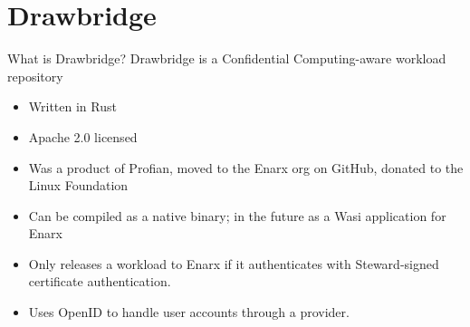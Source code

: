 \documentclass[graphics]{beamer}
\begin{document}
\section{Drawbridge}
\begin{frame}{What is Drawbridge?}
Drawbridge is a Confidential Computing-aware workload repository
\begin{itemize}
    \item Written in Rust
    \item Apache 2.0 licensed
    \item Was a product of Profian, moved to the Enarx org on GitHub, donated to the Linux Foundation
    \item Can be compiled as a native binary; in the future as a Wasi application for Enarx
    \item Only releases a workload to Enarx if it authenticates with Steward-signed certificate authentication.
    \item Uses OpenID to handle user accounts through a provider.
\end{itemize}
\end{frame}
\end{document}
